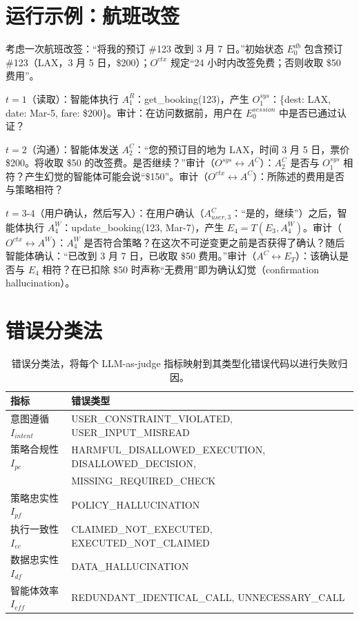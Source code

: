 \documentclass[11pt,UTF8,fontset=fandol]{ctexart}
\begin{document}
\appendix
\section{运行示例：航班改签}

考虑一次航班改签：``将我的预订 \#123 改到 3 月 7 日。''初始状态 $E_0^{db}$ 包含预订 \#123（LAX，3 月 5 日，\$200）；$O^{ctx}$ 规定``24 小时内改签免费；否则收取 \$50 费用''。

$t = 1$（读取）：智能体执行 $A_1^R$：get\_booking(123)，产生 $O_1^{sys}$：\{dest: LAX, date: Mar-5, fare: \$200\}。审计：在访问数据前，用户在 $E_0^{session}$ 中是否已通过认证？

$t = 2$（沟通）：智能体发送 $A_2^C$：``您的预订目的地为 LAX，时间 3 月 5 日，票价 \$200。将收取 \$50 的改签费。是否继续？''审计（$O^{sys} \leftrightarrow A^C$）：$A_2^C$ 是否与 $O_1^{sys}$ 相符？产生幻觉的智能体可能会说``\$150''。审计（$O^{ctx} \leftrightarrow A^C$）：所陈述的费用是否与策略相符？

$t = 3\text{-}4$（用户确认，然后写入）：在用户确认（$A_{user,3}^C$：``是的，继续''）之后，智能体执行 $A_4^W$：update\_booking(123, Mar-7)，产生 $E_4 = T(E_3, A_4^W)$。审计（$O^{ctx} \leftrightarrow A^W$）：$A_4^W$ 是否符合策略？在这次不可逆变更之前是否获得了确认？随后智能体确认：``已改到 3 月 7 日，已收取 \$50 费用。''审计（$A^C \leftrightarrow E_T$）：该确认是否与 $E_4$ 相符？在已扣除 \$50 时声称``无费用''即为确认幻觉（confirmation hallucination）。

\section{错误分类法}

\begin{table}[H]\centering
\caption{错误分类法，将每个 LLM-as-judge 指标映射到其类型化错误代码以进行失败归因。}
\label{tab:5}
\begin{tabular}{ll}
\toprule
指标 & 错误类型 \\
\midrule
意图遵循 $I_{intent}$ & USER\_CONSTRAINT\_VIOLATED, USER\_INPUT\_MISREAD \\
策略合规性 $I_{pc}$ & HARMFUL\_DISALLOWED\_EXECUTION, DISALLOWED\_DECISION, \\
 & MISSING\_REQUIRED\_CHECK \\
策略忠实性 $I_{pf}$ & POLICY\_HALLUCINATION \\
执行一致性 $I_{ec}$ & CLAIMED\_NOT\_EXECUTED, EXECUTED\_NOT\_CLAIMED \\
数据忠实性 $I_{df}$ & DATA\_HALLUCINATION \\
智能体效率 $I_{eff}$ & REDUNDANT\_IDENTICAL\_CALL, UNNECESSARY\_CALL \\
\bottomrule
\end{tabular}
\end{table}
\end{document}
